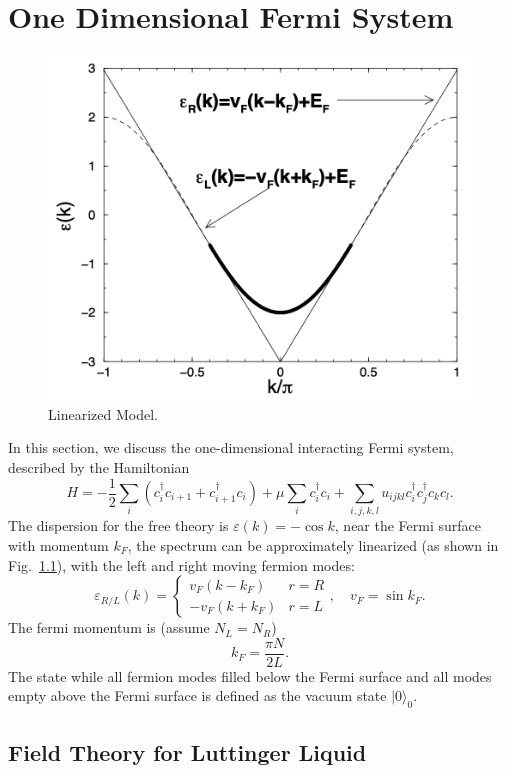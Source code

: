 \chapter{One Dimensional Fermi System}

\begin{figure}
	\centering
	\includegraphics[width=0.4\linewidth]{pics/FL-linearize.png}
	\caption{Linearized Model.}
	\label{fig:bs-linearize}
\end{figure}

In this section, we discuss the one-dimensional interacting Fermi system, described by the Hamiltonian
\begin{equation}
	H = -\frac{1}{2}\sum_{i} (c_i^\dagger c_{i+1} + c_{i+1}^\dagger c_i) + \mu\sum_i c_i^\dagger c_i + \sum_{i,j,k,l} u_{ijkl} c_i^\dagger c_j^\dagger c_k c_l.
\end{equation}
The dispersion for the free theory is $\varepsilon(k) = -\cos k$, near the Fermi surface with momentum $k_F$, the spectrum can be approximately linearized (as shown in Fig.~\ref{fig:bs-linearize}), with the left and right moving fermion modes:
\begin{equation}
	\varepsilon_{R/L}(k) = \begin{cases}
		v_F (k - k_F) & r=R \\
		-v_F (k + k_F) & r=L
	\end{cases},\quad v_F = \sin k_F.
\end{equation}
The fermi momentum is (assume $N_L=N_R$)
\begin{equation}
	k_F = \frac{\pi N}{2L}.
\end{equation}
The state while all fermion modes filled below the Fermi surface and all modes empty above the Fermi surface is defined as the vacuum state $|0\rangle_0$.



\section{Field Theory for Luttinger Liquid}

